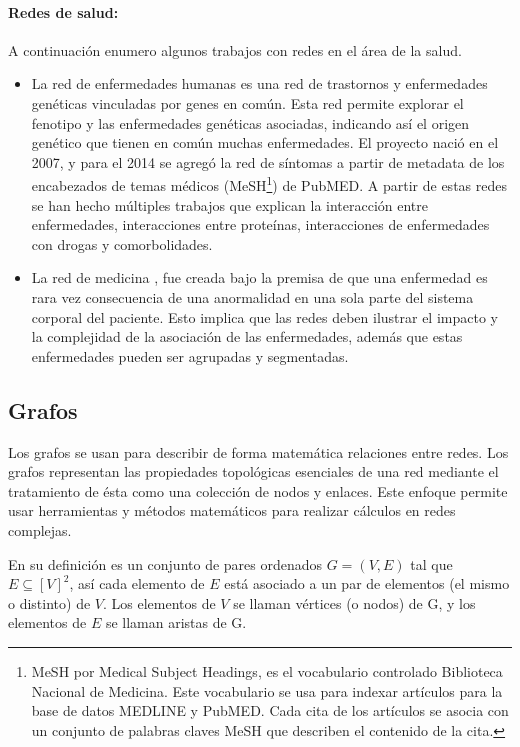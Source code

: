 \paragraph{Redes de salud:} A continuación enumero algunos trabajos con redes en el área de la salud.
\begin{itemize}
\item La red de enfermedades humanas \cite{Goh2007TheNetwork.} es una red de trastornos y enfermedades genéticas vinculadas por genes en común. Esta red permite explorar el fenotipo y las enfermedades genéticas asociadas, indicando así el origen genético que tienen en común muchas enfermedades. El proyecto nació en el 2007, y para el 2014 se agregó la red de síntomas a partir de metadata de los encabezados de temas médicos (MeSH\footnote{MeSH por Medical Subject Headings, es el vocabulario controlado Biblioteca Nacional de Medicina. Este vocabulario se usa para indexar artículos para la base de datos MEDLINE y PubMED. Cada cita de los artículos se asocia con un conjunto de palabras claves MeSH que describen el contenido de la cita.}) de PubMED. A partir de estas redes se han hecho múltiples trabajos que explican la interacción entre enfermedades, interacciones entre proteínas, interacciones de enfermedades con drogas y comorbolidades.
\item La red de medicina \cite{Haaren2013,Barabasi2011NetworkDisease}, fue creada  bajo la premisa de que una enfermedad es rara vez consecuencia de una anormalidad en una sola parte del sistema corporal del paciente. Esto implica que las redes deben ilustrar el impacto y la complejidad de la asociación de las enfermedades, además que estas enfermedades pueden ser agrupadas y segmentadas.
\end{itemize}

\subsection{Grafos}
Los grafos se usan para describir de forma matemática relaciones entre redes. Los grafos representan las propiedades topológicas esenciales de una red mediante el tratamiento de ésta como una colección de nodos y enlaces. Este enfoque permite usar herramientas y métodos matemáticos para realizar cálculos en redes complejas.

En su definición es un conjunto de pares ordenados $G=(V,E)$ tal que $E\subseteq [V]^{2}$, así cada elemento de $E$ está asociado a un par de elementos (el mismo o distinto) de $V$. Los elementos de $V$ se llaman vértices (o nodos) de G, y los elementos de $E$ se llaman aristas de G.\cite{Diestel2005GraphTheory,Balakrishnan2000ATheory} 

